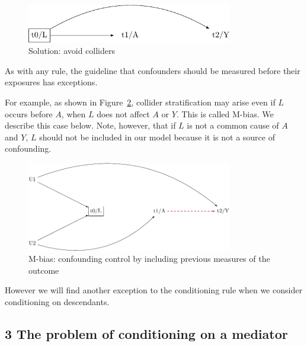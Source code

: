 \documentclass[
  singlecolumn]{report}
\begin{document}
\begin{figure}

{\centering \includegraphics[width=0.8\textwidth,height=\textheight]{causal-dags_files/figure-pdf/fig-dag-common-effect-solution-1.pdf}

}

\caption{\label{fig-dag-common-effect-solution}Solution: avoid
colliders}

\end{figure}

As with any rule, the guideline that confounders should be measured
before their exposures has exceptions.

For example, as shown in Figure~\ref{fig-m-bias}, collider
stratification may arise even if \(L\) occurs before \(A\), when \(L\)
does not affect \(A\) or \(Y\). This is called M-bias. We describe this
case below. Note, however, that if \(L\) is not a common cause of \(A\)
and \(Y\), \(L\) should not be included in our model because it is not a
source of confounding.

\begin{figure}

{\centering \includegraphics[width=0.8\textwidth,height=\textheight]{causal-dags_files/figure-pdf/fig-m-bias-1.pdf}

}

\caption{\label{fig-m-bias}M-bias: confounding control by including
previous measures of the outcome}

\end{figure}

However we will find another exception to the conditioning rule when we
consider conditioning on descendants.

\hypertarget{the-problem-of-conditioning-on-a-mediator}{%
\subsection{3 The problem of conditioning on a
mediator}\label{the-problem-of-conditioning-on-a-mediator}}
\end{document}
